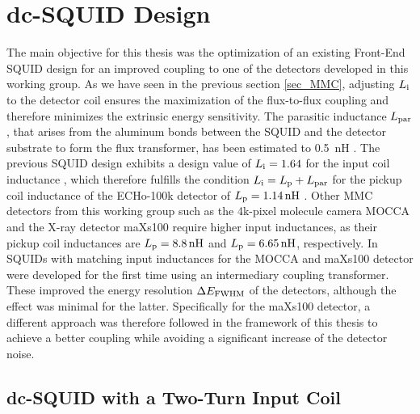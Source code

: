 \chapter{dc-SQUID Design} \label{ch_SQUIDdesign}

The main objective for this thesis was the optimization of an existing Front-End SQUID design for an improved coupling to one of the detectors developed in this working group. As we have seen in the previous section \ref{sec_MMC}, adjusting $L_{\rm i}$ to the detector coil ensures the maximization of the flux-to-flux coupling and therefore minimizes the extrinsic energy sensitivity. The parasitic inductance $L_{\rm par}$, that arises from the aluminum bonds between the SQUID and the detector substrate to form the flux transformer, has been estimated to \qty{0.5}{\nano\henry} \cite{Hengstler2017}. The previous SQUID design exhibits a design value of $L_{\rm i}=1.64$ for the input coil inductance \cite{Bauer2022}, which therefore fulfills the condition $L_{\rm i}=L_{\rm p}+L_{\rm par}$ for the pickup coil inductance of the ECHo-100k detector of $L_{\rm p}=\qty{1.14}{\nano\henry}$ \cite{Mantegazzini2021}. Other MMC detectors from this working group such as the 4k-pixel molecule camera MOCCA and the X-ray detector maXs100 require higher input inductances, as their pickup coil inductances are $L_{\rm p}=\qty{8.8}{\nano\henry}$ and $L_{\rm p}=\qty{6.65}{\nano\henry}$, respectively. In \cite{Bauer2022} SQUIDs with matching input inductances for the MOCCA and maXs100 detector were developed for the first time using an intermediary coupling transformer. These improved the energy resolution $\Delta E_{\rm FWHM}$ of the detectors, although the effect was minimal for the latter. Specifically for the maXs100 detector, a different approach was therefore followed in the framework of this thesis to achieve a better coupling while avoiding a significant increase of the detector noise.  

\section{dc-SQUID with a Two-Turn Input Coil} \label{sec_FEdesign}


